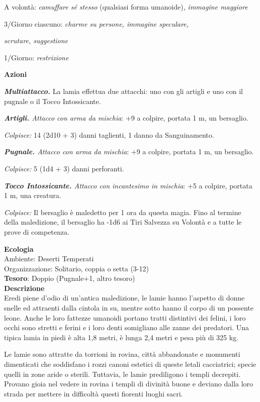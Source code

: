 \begin{multicols}{2}
A volontà: \textit{camuffare sé stesso} (qualsiasi forma umanoide)\textit{,} \textit{immagine maggiore}

3/Giorno ciascuno: \textit{charme su persone, immagine speculare,}

\textit{scrutare, suggestione}

1/Giorno: \textit{restrizione}

\textbf{Azioni}

\textit{\textbf{Multiattacco.}} La lamia effettua due attacchi: uno con gli artigli e uno con il pugnale o il Tocco Intossicante.

\textit{\textbf{Artigli.} Attacco con arma da mischia}: +9 a colpire, portata 1 m, un bersaglio.

\textit{Colpisce:} 14 (2d10 + 3) danni taglienti, 1 danno da Sanguinamento.

\textit{\textbf{Pugnale.} Attacco con arma da mischia}: +9 a colpire, portata 1 m, un bersaglio.

\textit{Colpisce:} 5 (1d4 + 3) danni perforanti.

\textit{\textbf{Tocco Intossicante.} Attacco con incantesimo in mischia}: +5 a colpire, portata 1 m, una creatura.

\textit{Colpisce:} Il bersaglio è maledetto per 1 ora da questa magia. Fino al termine della maledizione, il bersaglio ha -1d6 ai Tiri Salvezza su Volontà e a tutte le prove di competenza.

\textbf{Ecologia}\\
Ambiente: Deserti Temperati\\
Organizzazione: Solitario, coppia o setta (3-12)\\
\textbf{Tesoro}: Doppio (Pugnale+1, altro tesoro)\\

\textbf{Descrizione}\\
Eredi piene d'odio di un'antica maledizione, le lamie hanno l'aspetto di donne snelle ed attraenti dalla cintola in su, mentre sotto hanno il corpo di un possente leone. Anche le loro fattezze umanoidi portano tratti distintivi dei felini, i loro occhi sono stretti e ferini e i loro denti somigliano alle zanne dei predatori. Una tipica lamia in piedi è alta 1,8 metri, è lunga 2,4 metri e pesa più di 325 kg.

Le lamie sono attratte da torrioni in rovina, città abbandonate e monumenti dimenticati che soddisfano i rozzi canoni estetici di queste letali cacciatrici; specie quelli in zone aride o sterili. Tuttavia, le lamie prediligono i templi decrepiti. Provano gioia nel vedere in rovina i templi di divinità buone e deviano dalla loro strada per mettere in difficoltà questi fiorenti luoghi sacri.


\end{multicols}
